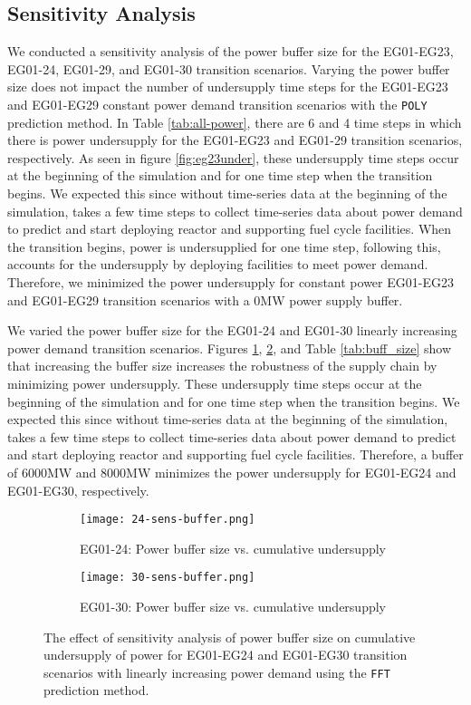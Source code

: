 \subsection{Sensitivity Analysis}
We conducted a sensitivity analysis of the power buffer size for the
EG01-EG23, EG01-24, EG01-29, and EG01-30 transition scenarios. 
Varying the power buffer size does not impact the number of 
undersupply time steps for the EG01-EG23 and EG01-EG29 constant 
power demand transition scenarios with the \texttt{POLY} prediction method.
In Table \ref{tab:all-power}, there are 6 and 4 time steps
in which there is power undersupply for the EG01-EG23 and EG01-29 
transition scenarios, respectively. 
As seen in figure \ref{fig:eg23under}, these undersupply time 
steps occur at the beginning of the simulation and for one 
time step when the transition begins. 
We expected this since without time-series data 
at the beginning of the simulation, \deploy takes a few 
time steps to collect time-series data about power demand 
to predict and start deploying reactor and supporting 
fuel cycle facilities. 
When the transition begins, power is undersupplied for one 
time step, following this, \deploy accounts for the 
undersupply by deploying facilities to meet power demand.
Therefore, we minimized the power undersupply for constant 
power EG01-EG23 and EG01-EG29 transition scenarios with 
a 0MW power supply buffer. 

We varied the power buffer size for the EG01-24 and EG01-30 
linearly increasing power demand transition scenarios. 
Figures \ref{fig:eg24-bufplot}, \ref{fig:eg30-bufplot}, 
and Table \ref{tab:buff_size} 
show that increasing the buffer size increases the robustness 
of the supply chain by minimizing power undersupply. 
These undersupply time 
steps occur at the beginning of the simulation and for one 
time step when the transition begins. 
We expected this since without time-series data 
at the beginning of the simulation, \deploy takes a few 
time steps to collect time-series data about power demand 
to predict and start deploying reactor and supporting 
fuel cycle facilities. 
Therefore, a buffer of 6000MW and 8000MW minimizes 
the power undersupply for EG01-EG24 and EG01-EG30, respectively.

\begin{figure}[]
	\centering
	\begin{subfigure}[t]{\textwidth}
		\centering
		\texttt{[image: 24-sens-buffer.png]} 
		\caption{EG01-24: Power buffer size vs. cumulative undersupply}
		\label{fig:eg24-bufplot}
	\end{subfigure}
	\begin{subfigure}[t]{\textwidth}
		\centering
		\texttt{[image: 30-sens-buffer.png]} 
		\caption{EG01-30: Power buffer size vs. cumulative undersupply}
		\label{fig:eg30-bufplot}
	\end{subfigure}
	\hfill
	\caption{The effect of sensitivity analysis of power buffer size on cumulative 
	undersupply of power for EG01-EG24 and EG01-EG30 transition scenarios 
	with linearly increasing power demand using the \texttt{FFT} prediction method.}
	\label{fig:sabuffer}
\end{figure}

